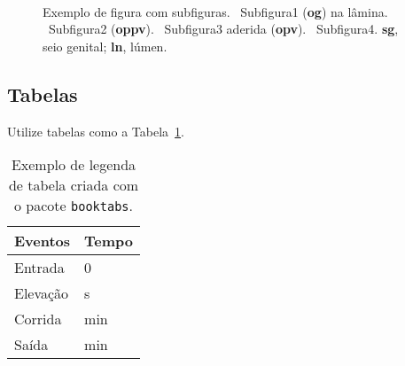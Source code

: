\begin{figure}[htbp]
  \centering
  \vspace{11pt}
  \\
  \vspace{-18pt}
  \vspace{11pt}
  \caption[Figura com subfiguras]{Exemplo de figura com subfiguras. ~Subfigura1 (\textbf{og}) na lâmina. ~Subfigura2 (\textbf{oppv}). ~Subfigura3 aderida (\textbf{opv}). ~Subfigura4. \textbf{sg}, seio genital; \textbf{ln}, lúmen.}%
  \label{fig:tufo}
\end{figure}

\subsection{Tabelas}\label{cap2:res:tabs}

Utilize tabelas como a Tabela~\ref{tab:exemplo}.

\begin{table}[htbp]
  \caption[Tabela com \texttt{booktabs}]{Exemplo de legenda de tabela criada com o pacote \texttt{booktabs}.}
  \label{tab:exemplo}
  \vspace{1em}
  \centering
  \begin{tabular}{l l}
    \toprule
    Eventos		&	Tempo\\
    \midrule
    Entrada		&	0\\
    Elevação		&	\unit[40]{s}\\
    Corrida		&	\unit[6]{min}\\
    Saída		&	\unit[15]{min}\\
    \bottomrule
  \end{tabular}
\end{table}


